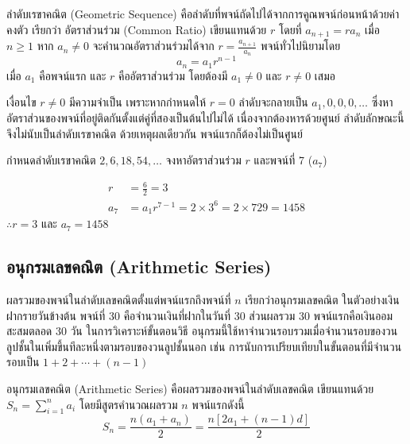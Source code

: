 \begin{definition}
ลำดับเรขาคณิต (Geometric Sequence) คือลำดับที่พจน์ถัดไปได้จากการคูณพจน์ก่อนหน้าด้วยค่าคงตัว เรียกว่า อัตราส่วนร่วม (Common Ratio) เขียนแทนด้วย $r$ โดยที่ $a_{n+1} = r a_n$ เมื่อ $n \geq 1$ หาก $a_n \neq 0$ จะคำนวณอัตราส่วนร่วมได้จาก $r = \frac{a_{n+1}}{a_n}$ พจน์ทั่วไปนิยามโดย
\[ a_n = a_1 r^{n-1} \]
เมื่อ $a_1$ คือพจน์แรก และ $r$ คืออัตราส่วนร่วม โดยต้องมี $a_1 \neq 0$ และ $r \neq 0$ เสมอ
\end{definition}

เงื่อนไข $r \neq 0$ มีความจำเป็น เพราะหากกำหนดให้ $r = 0$ ลำดับจะกลายเป็น $a_1, 0, 0, 0, \dots$ ซึ่งหาอัตราส่วนของพจน์ที่อยู่ติดกันตั้งแต่คู่ที่สองเป็นต้นไปไม่ได้ เนื่องจากต้องหารด้วยศูนย์ ลำดับลักษณะนี้จึงไม่นับเป็นลำดับเรขาคณิต ด้วยเหตุผลเดียวกัน พจน์แรกก็ต้องไม่เป็นศูนย์

\begin{ex}
\label{ex:geom-seq-find-term}
กำหนดลำดับเรขาคณิต $2, 6, 18, 54, \dots$ จงหาอัตราส่วนร่วม $r$ และพจน์ที่ 7 ($a_7$)
\end{ex}
\begin{solution}
\begin{align*}
r &= \frac{6}{2} = 3\\
a_7 &= a_1 r^{7-1} = 2 \times 3^6 = 2 \times 729 = 1458
\end{align*}
$\therefore r = 3$ และ $a_7 = 1458$ \solhere
\end{solution}

\subsection{อนุกรมเลขคณิต (Arithmetic Series)}
\label{sec:arithmetic-series}
ผลรวมของพจน์ในลำดับเลขคณิตตั้งแต่พจน์แรกถึงพจน์ที่ $n$ เรียกว่าอนุกรมเลขคณิต ในตัวอย่างเงินฝากรายวันข้างต้น พจน์ที่ 30 คือจำนวนเงินที่ฝากในวันที่ 30 ส่วนผลรวม 30 พจน์แรกคือเงินออมสะสมตลอด 30 วัน ในการวิเคราะห์ขั้นตอนวิธี อนุกรมนี้ใช้หาจำนวนรอบรวมเมื่อจำนวนรอบของวนลูปชั้นในเพิ่มขึ้นทีละหนึ่งตามรอบของวนลูปชั้นนอก เช่น การนับการเปรียบเทียบในขั้นตอนที่มีจำนวนรอบเป็น $1+2+\cdots+(n-1)$~\parencite{rosen2019discrete}

\begin{definition}[อนุกรมเลขคณิต]
อนุกรมเลขคณิต (Arithmetic Series) คือผลรวมของพจน์ในลำดับเลขคณิต เขียนแทนด้วย $S_n = \sum_{i=1}^{n} a_i$ โดยมีสูตรคำนวณผลรวม $n$ พจน์แรกดังนี้
\[ S_n = \frac{n(a_1 + a_n)}{2} = \frac{n[2a_1 + (n-1)d]}{2} \]
\end{definition}

